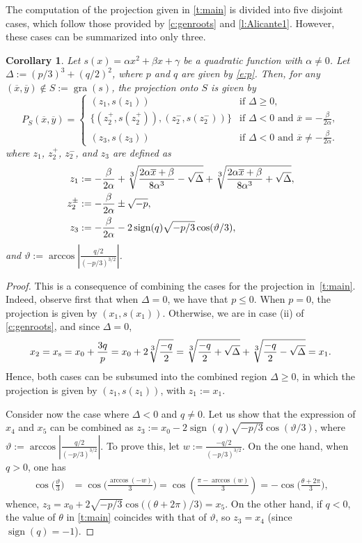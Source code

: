 \documentclass[11pt]{article}
\newtheorem{corollary}[theorem]{Corollary}
\providecommand{\sign}{\operatorname{sign}}
\providecommand{\gra}{\operatorname{gra}}
\newcommand{\px}{\overline{x}}
\newcommand{\py}{\overline{y}}
\begin{document}
The computation of the projection given in \cref{t:main} is divided into five disjoint cases, which follow those provided by \cref{c:genroots} and \cref{l:Alicante1}. However, these cases can be summarized into only three. 

\begin{corollary}\label{c:main}
    Let $s(x)=\alpha x^2+\beta x+\gamma$ be a quadratic function with $\alpha\neq 0$. Let $\Delta := (p/3)^3+(q/2)^2$, where $p$ and $q$ are given by \cref{e:p}. Then, for any $(\px,\py)\notin S:=\gra(s)$, the projection onto $S$ is given by
    \[P_S(\px,\py)=\begin{cases}
        (z_1,s(z_1)) & \text{if }\Delta\geq 0,\\
        \{(z^+_2,s(z^+_2)),(z^-_2,s(z^-_2))\} &\text{if }\Delta<0\text{ and }\px=-\frac{\beta}{2\alpha},\\
        (z_3,s(z_3)) &\text{if }\Delta<0\text{ and }\px\neq-\frac{\beta}{2\alpha}.
    \end{cases}\]
    where $z_1$, $z_2^+$, $z_2^-$, and $z_3$ are defined as
    \begin{align*}
        z_1&:=-\frac{\beta}{2\alpha}+\sqrt[\mathlarger 3]{\frac{2\alpha\px+\beta}{8\alpha^3}-\sqrt{\Delta}}+\sqrt[\mathlarger 3]{\frac{2\alpha\px+\beta}{8\alpha^3}+ \sqrt{\Delta}},\\
        z_2^\pm&:=-\frac{\beta}{2\alpha}\pm\sqrt{-p},\\
        z_3&:=-\frac{\beta}{2\alpha}-2\sign(q)\sqrt{-p/3}\cos(\vartheta/3), 
    \end{align*}
and $\vartheta:=\arccos\left|\frac{q/2}{(-p/3)^{3/2}}\right|$.
\end{corollary}

\begin{proof}
This is a consequence of combining the cases for the projection in~\cref{t:main}. Indeed, observe first that when $\Delta=0$, we have that $p\leq0$. When $p=0$, the projection is given by $(x_1,s(x_1))$. Otherwise, we are in case (ii) of \cref{c:genroots}, and 
since $\Delta=0$,
$$x_2=x_\text{s}=x_0+\frac{3q}{p}= x_0+2\sqrt[\mathlarger 3]{\frac{-q}{2}}=\sqrt[\mathlarger 3]{\frac{-q}{2}+ \sqrt{\Delta}}+\sqrt[\mathlarger 3]{\frac{-q}{2}-\sqrt{\Delta}}=x_1.$$ 
Hence, both cases can be subsumed into the combined region $\Delta\geq 0$, in which the projection is given by $(z_1,s(z_1))$, with $z_1:=x_1$. 

Consider now the case where $\Delta<0$ and $q\neq 0$. Let us show that the expression of $x_4$ and $x_5$ can be combined as $z_3:=x_0-2\sign(q)\sqrt{-p/3}\cos(\vartheta/3)$, where $\vartheta:=\arccos\left|\frac{q/2}{(-p/3)^{3/2}}\right|$. To prove this, let $w:=\frac{-q/2}{(-p/3)^{3/2}}$. On the one hand, when $q>0$, one has 
\begin{align*}
    \cos\Big(\frac{\vartheta}{3}\Big)&=\cos\Big(\frac{\arccos(-w)}{3}\Big)=\cos\left(\frac{\pi-\arccos(w)}{3}\right)
    =-\cos\Big(\frac{\theta+2\pi}{3}\Big),
\end{align*}
whence, $z_3=x_0+2\sqrt{-p/3}\cos\big((\theta+2\pi)/3\big)=x_5$.
On the other hand, if $q<0$, the value of $\theta$ in \cref{t:main} coincides with that of $\vartheta$, so $z_3=x_4$ (since $\sign(q)=-1$). 
\end{proof}
\end{document}
